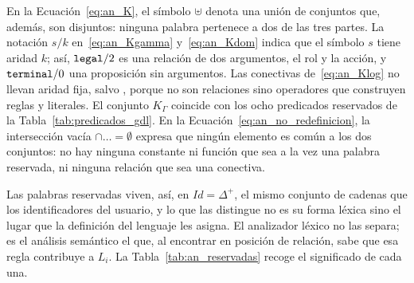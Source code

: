 En la Ecuación~\eqref{eq:an_K}, el símbolo $\uplus$ denota una unión de conjuntos que, además, son disjuntos: ninguna palabra pertenece a dos de las tres partes. La notación $s/k$ en~\eqref{eq:an_Kgamma} y~\eqref{eq:an_Kdom} indica que el símbolo $s$ tiene aridad $k$; así, $\texttt{legal}/2$ es una relación de dos argumentos, el rol y la acción, y $\texttt{terminal}/0$ una proposición sin argumentos. Las conectivas de~\eqref{eq:an_Klog} no llevan aridad fija, salvo , porque no son relaciones sino operadores que construyen reglas y literales. El conjunto $K_\Gamma$ coincide con los ocho predicados reservados de la Tabla~\ref{tab:predicados_gdl}. En la Ecuación~\eqref{eq:an_no_redefinicion}, la intersección vacía $\cap \ldots = \emptyset$ expresa que ningún elemento es común a los dos conjuntos: no hay ninguna constante ni función que sea a la vez una palabra reservada, ni ninguna relación que sea una conectiva.

Las palabras reservadas viven, así, en $\mathit{Id} = \Delta^+$, el mismo conjunto de cadenas que los identificadores del usuario, y lo que las distingue no es su forma léxica sino el lugar que la definición del lenguaje les asigna. El analizador léxico no las separa; es el análisis semántico el que, al encontrar  en posición de relación, sabe que esa regla contribuye a $L_i$. La Tabla~\ref{tab:an_reservadas} recoge el significado de cada una.

